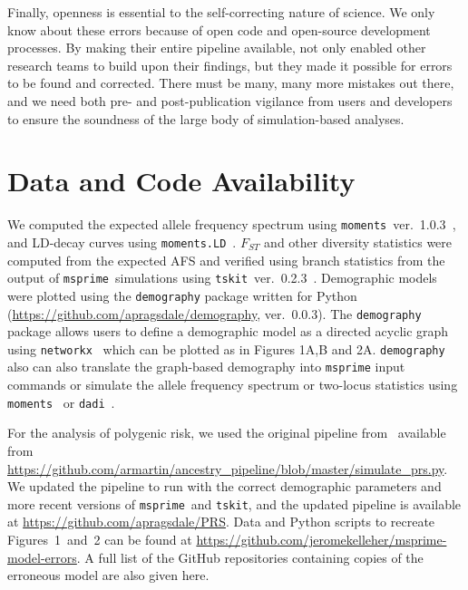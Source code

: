 \documentclass{article}
\newcommand{\msprime}[0]{\texttt{msprime}}
\newcommand{\tskit}[0]{\texttt{tskit}}
\begin{document}
Finally, openness is essential to the self-correcting nature of science.
We only know about these errors because of open code and
open-source development processes. By making their entire pipeline available,
\citet{martin2017human} not only enabled other research teams to build upon their findings,
but they made it possible for errors to be found and corrected.
There must be many, many more mistakes out there, and we need both
pre- and post-publication vigilance from users and developers to ensure the
soundness of the large body of simulation-based analyses.

\section*{Data and Code Availability}

We computed the expected allele frequency spectrum using
\texttt{moments}~ver.~1.0.3~\citep{jouganous2017inferring}, and LD-decay curves using
\texttt{moments.LD}~\citep{ragsdale2019models}. $F_{ST}$ and other diversity statistics
were computed from the expected AFS and verified using branch statistics from
the output of \msprime\ simulations using \tskit~ver.~0.2.3~\citep{ralph2020efficiently}.
Demographic models were plotted using the \texttt{demography} package written for Python
(\url{https://github.com/apragsdale/demography}, ver.~0.0.3). The \texttt{demography} package
allows users to define a demographic model as a directed acyclic graph using
\texttt{networkx}~\citep{hagberg2008exploring} which can be plotted as in Figures 1A,B and 2A.
\texttt{demography} also can also translate the graph-based demography into \texttt{msprime} input
commands or simulate the allele frequency spectrum or two-locus statistics using
\texttt{moments}~\citep{jouganous2017inferring, ragsdale2019models}
or \texttt{dadi}~\citep{gutenkunst2009inferring}.


For the analysis of polygenic risk, we used the original pipeline
from~\citet{martin2017human} available from
\url{https://github.com/armartin/ancestry_pipeline/blob/master/simulate_prs.py}.
We updated the pipeline to run with the correct demographic parameters and more
recent versions of \msprime\ and \tskit, and the updated pipeline is
available at \url{https://github.com/apragsdale/PRS}.
Data and Python scripts to recreate Figures~1~and~2 can be found at
\url{https://github.com/jeromekelleher/msprime-model-errors}.
A full list of the GitHub repositories containing copies of the erroneous
model are also given here.
\end{document}
